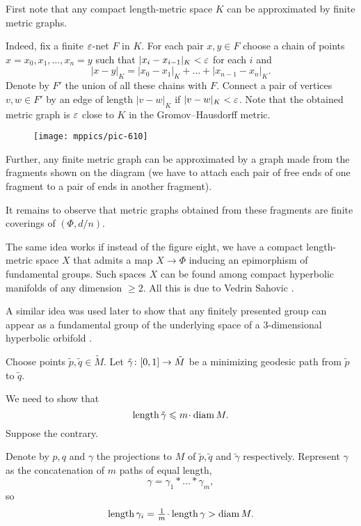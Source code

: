 First note that any compact length-metric space $K$ can be approximated by finite metric graphs.

Indeed, fix a finite $\varepsilon$-net $F$ in $K$.
For each pair $x,y\in F$ choose a chain of points $x=x_0,x_1,\dots, x_n=y$ such that
$|x_i-x_{i-1}|_K<\varepsilon$ for each $i$ and 
\[|x-y|_K=|x_0-x_1|_K+\dots+|x_{n-1}-x_n|_K.\]
Denote by $F'$ the union of all these chains with $F$.
Connect a pair of vertices $v,w\in F'$ by an edge of length $|v-w|_K$ if $|v-w|_K<\varepsilon$.
Note that the obtained metric graph is $\varepsilon$ close to $K$ in the Gromov--Hausdorff metric.

\begin{wrapfigure}{o}{25 mm}
\vskip-3mm
\centering
\texttt{[image: mppics/pic-610]}
\vskip-3mm
\end{wrapfigure}

Further, any finite metric graph can be approximated by a graph made from the fragments shown on the diagram
(we have to attach each pair of free ends of one fragment to a pair of ends in another fragment).

It remains to observe that metric graphs obtained from these fragments are finite coverings of $(\Phi,d/n)$.
\qeds


The same idea works if instead of the figure eight, we have a compact length-metric space $X$ that admits a map $X\to\Phi$ inducing an epimorphism of fundamental groups.
Such spaces $X$ can be found among compact hyperbolic manifolds of any dimension $\ge 2$.
All this is due to Vedrin Sahovic \cite{sahovic}.

A similar idea was used later to show that any finitely presented group can appear as a fundamental group of the underlying space of a 3-dimensional hyperbolic orbifold \cite{panov-petrunin-telescopic}.





Choose points $\tilde p,\tilde q\in\tilde M$.
Let  
$\tilde\gamma\:[0,1]\z\to \tilde M$ be a minimizing geodesic path from $\tilde p$ to $\tilde q$. 

We need to show that 
\[\length \tilde\gamma\le m\cdot \diam M.\]
Suppose the contrary.

Denote by $p,q$ and $\gamma$ the projections to $M$ of $\tilde p,\tilde q$ and $\tilde \gamma$ respectively. 
Represent $\gamma$
as the concatenation of $m$ paths of equal length,
\[\gamma=\gamma_1{*}\dots{*}\gamma_m,\] 
so
\[\length\gamma_i=\tfrac{1}m\cdot\length\gamma>\diam M.\] 

